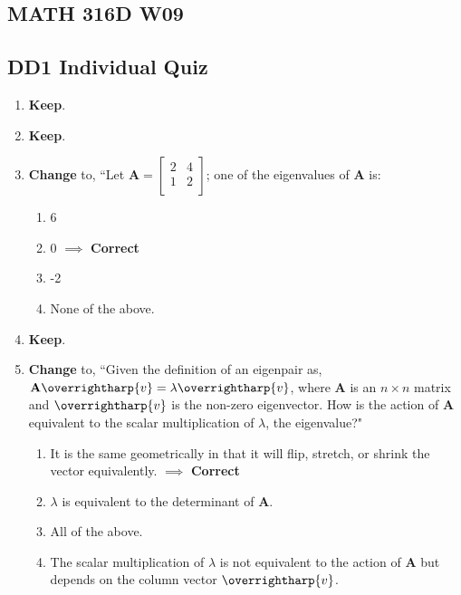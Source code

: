 \documentclass[fleqn]{article}[11pt]
\begin{document}
	
\begin{center}\section*{MATH 316D W09}\end{center}
\subsection*{DD1 Individual Quiz}

\begin{enumerate}
	\item \textbf{Keep}.
	
	\item \textbf{Keep}.
	
	\item \textbf{Change} to, ``Let \(\mathbf{A}=\begin{bmatrix}
									2 & 4 \\
									1 & 2 \\
								\end{bmatrix}\); one of the eigenvalues of $\mathbf{A}$ is:
		\begin{enumerate}
			\item 6
			\item 0 $\implies$ \textbf{Correct}
			\item -2
			\item None of the above.
		\end{enumerate}
		
	 \item \textbf{Keep}.
	 
	 \item\textbf{Change} to, ``Given the definition of an eigenpair as, $\mathbf{A}\overrightharp{v}=\lambda \overrightharp{v}$, where $\mathbf{A}$ is an $n\times n$ matrix and $\overrightharp{v}$ is the non-zero eigenvector. How is the action of $\mathbf{A}$ equivalent to the scalar multiplication of $\lambda$, the eigenvalue?" 
	 
	 	\begin{enumerate}
	 		\item It is the same geometrically in that it will flip, stretch, or shrink the vector equivalently. $\implies$ \textbf{Correct}
			\item $\lambda$ is equivalent to the determinant of $\mathbf{A}$.
			\item All of the above.
			\item The scalar multiplication of $\lambda$ is not equivalent to the action of $\mathbf{A}$ but depends on the column vector $\overrightharp{v}$.
		\end{enumerate}
	 
\end{enumerate}
\end{document}
